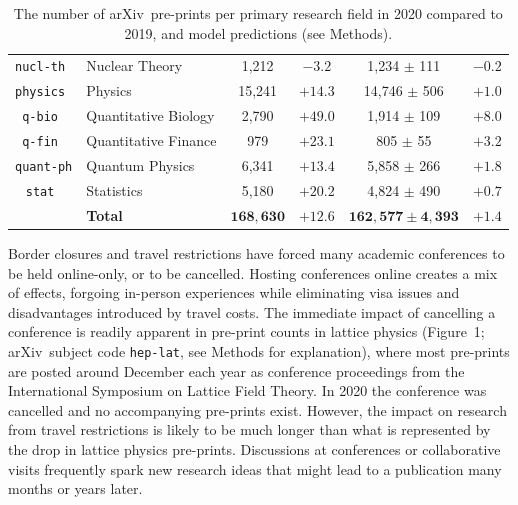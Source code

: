 \documentclass[a4paper,12pt]{article}
\newcommand{\arxiv}{arXiv}
\begin{document}
\begin{table}
\begin{center}
\begin{tabular}{|c|l|c|c|c|c|}
\texttt{nucl-th }    & Nuclear Theory         & 1,212     & $ -3.2$ & 1,234 $\pm$ 111       & $-0.2$ \\
\texttt{physics }    & Physics                & 15,241    & $+14.3$ & 14,746 $\pm$ 506      & $+1.0$ \\
\texttt{q-bio   }    & Quantitative Biology   & 2,790     & $+49.0$ & 1,914 $\pm$ 109       & $+8.0$ \\
\texttt{q-fin   }    & Quantitative Finance   & 979       & $+23.1$ & 805 $\pm$ 55          & $+3.2$ \\
\texttt{quant-ph}    & Quantum Physics        & 6,341     & $+13.4$ & 5,858 $\pm$ 266       & $+1.8$ \\
\texttt{stat    }    & Statistics             & 5,180     & $+20.2$ & 4,824 $\pm$ 490       & $+0.7$ \\
\hline
&\cellcolor{gray!25}\textbf{Total} & \cellcolor{gray!25}$\mathbf{168{,}630}$ & \cellcolor{gray!25}$\mathbf{+12.6}$ & \cellcolor{gray!25}$\mathbf{162{,}577 \pm 4{,}393}$ \cellcolor{gray!25}& \cellcolor{gray!25}$\mathbf{+1.4}$ \\
\hline 
    \end{tabular}
       \caption{The number of \arxiv\ pre-prints per primary research field in 2020 compared to 2019, and model predictions (see Methods).}
  \end{center}
\end{table}

Border closures and travel restrictions have forced many academic conferences to be held online-only, or to be cancelled. Hosting conferences online creates a mix of effects, forgoing in-person experiences while eliminating visa issues and disadvantages introduced by travel costs\cite{Guinnessy:2021}. The immediate impact of cancelling a conference is readily apparent in pre-print counts in lattice physics (Figure~1; \arxiv\ subject code \texttt{hep-lat}, see Methods for explanation), where most pre-prints are posted around December each year as conference proceedings from the International Symposium on Lattice Field Theory. In 2020 the conference was cancelled\cite{LatticeConferenceWebsite} and no accompanying pre-prints exist. However, the impact on research from travel restrictions is likely to be much longer than what is represented by the drop in lattice physics pre-prints. Discussions at conferences or collaborative visits frequently spark new research ideas that might lead to a publication many months or years later. 
\end{document}
